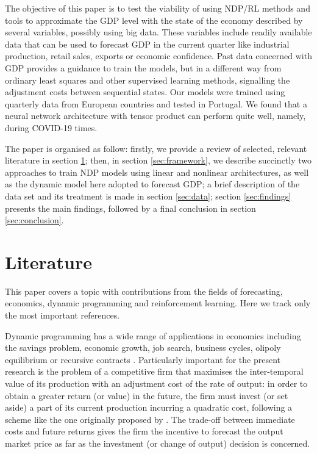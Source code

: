The objective of this paper is to test the viability of using NDP/RL methods and tools to approximate the GDP level with the state of the economy described by several variables, possibly using big data. These variables include readily available data that can be used to forecast GDP in the current quarter like industrial production, retail sales, exports or economic confidence. Past data concerned with GDP provides a guidance to train the models, but in a different way from ordinary least squares and other supervised learning methods, signalling the adjustment costs between sequential states. Our models were trained using quarterly data from European countries and tested in Portugal. We found that a neural network architecture with tensor product can perform quite well, namely, during COVID-19 times.

The paper is organised as follow: firstly, we provide a review of selected, relevant literature in section \ref{sec:literature}; then, in section \ref{sec:framework}, we describe succinctly two approaches to train NDP models using linear and nonlinear architectures, as well as the dynamic model here adopted to forecast GDP; a brief description of the data set and its treatment is made in section \ref{sec:data}; section \ref{sec:findings} presents the main findings, followed by a final conclusion in section \ref{sec:conclusion}. 


\section{Literature}
\label{sec:literature}

This paper covers a topic with contributions from the fields of forecasting, economics, dynamic programming and reinforcement learning. Here we track only the most important references.

Dynamic programming has a wide range of applications in economics including the savings problem, economic growth, job search, business cycles, olipoly equilibrium or recursive contracts \citep{Ljungqvist2018}. Particularly important for the present research is the problem of a competitive firm that maximises the inter-temporal value of its production with an adjustment cost of the rate of output: in order to obtain a greater return (or value) in the future, the firm must invest (or set aside) a part of its current production incurring a quadratic cost, following a scheme like the one originally proposed by \citet{LucasJr.1971}. The trade-off between immediate costs and future returns gives the firm the incentive to forecast the output market price as far as the investment (or change of output) decision is concerned.  

